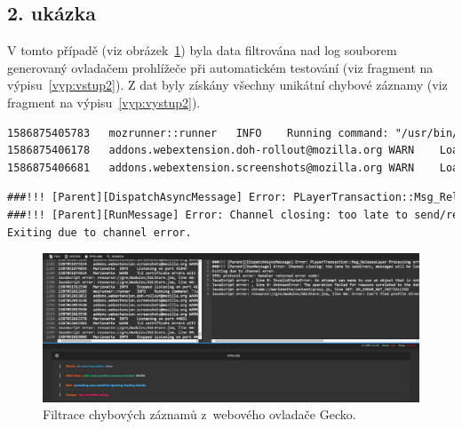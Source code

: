 \subsection*{2. ukázka}
V tomto případě (viz obrázek~\ref{obr:Filtrace2}) byla data filtrována nad log souborem generovaný ovladačem prohlížeče při automatickém testování (viz fragment na výpisu~\ref{vyp:vstup2}). Z dat byly získány všechny unikátní chybové záznamy (viz fragment na výpisu~\ref{vyp:vystup2}).
\begin{lstlisting}[language=TeX, caption={Fragment vstupních dat.}, label={vyp:vstup2}]
1586875405783	mozrunner::runner	INFO	Running command: "/usr/bin/firefox" "-marionette" "-foreground" "-no-remote" "-profile" "/tmp/rust_mozprofileuOpWOb"
1586875406178	addons.webextension.doh-rollout@mozilla.org	WARN	Loading extension 'doh-rollout@mozilla.org': Reading manifest: Invalid extension permission: networkStatus
1586875406681	addons.webextension.screenshots@mozilla.org	WARN	Loading extension 'screenshots@mozilla.org': Reading manifest: Invalid extension permission: mozillaAddons
\end{lstlisting}

\begin{lstlisting}[language=TeX, caption={Fragment výstupních dat.}, label={vyp:vystup2}]
###!!! [Parent][DispatchAsyncMessage] Error: PLayerTransaction::Msg_ReleaseLayer Processing error: message was deserialized, but the handler returned false (indicating failure)
###!!! [Parent][RunMessage] Error: Channel closing: too late to send/recv, messages will be lost
Exiting due to channel error. 
\end{lstlisting}

\begin{figure}[hbt]
	\centering
	\setlength{\fboxsep}{0pt}
	\includegraphics[width=1\textwidth]{obrazky-figures/Filtrace2.PNG}
	\caption{Filtrace chybových záznamů z~webového ovladače Gecko.}
	\label{obr:Filtrace2}
\end{figure}

